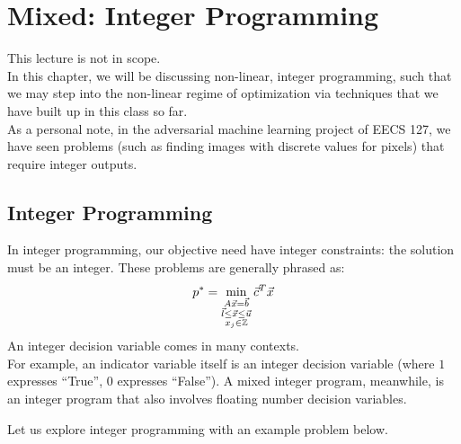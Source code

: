 \chapter{Mixed: Integer Programming}
This lecture is not in scope. \\
In this chapter, we will be discussing non-linear, integer programming, such that we may step into the non-linear regime of optimization via techniques that we have built up in this class so far. \\
As a personal note, in the adversarial machine learning project of EECS 127, we have seen problems (such as finding images with discrete values for pixels) that require integer outputs.

\section{Integer Programming}
In integer programming, our objective need have integer constraints: the solution must be an integer.
These problems are generally phrased as:
\[
    p^* = \min_{
        \substack{
            A \vec{x} = \vec{b} \\
            \vec{l} \leq \vec{x} \leq \vec{u} \\
            x_j \in \mathbb{Z}
        }
    } \vec{c}^T \vec{x}
\]
An integer decision variable comes in many contexts. \\
For example, an indicator variable itself is an integer decision variable (where $1$ expresses ``True'', $0$ expresses ``False'').
A mixed integer program, meanwhile, is an integer program that also involves floating number decision variables.

Let us explore integer programming with an example problem below.

